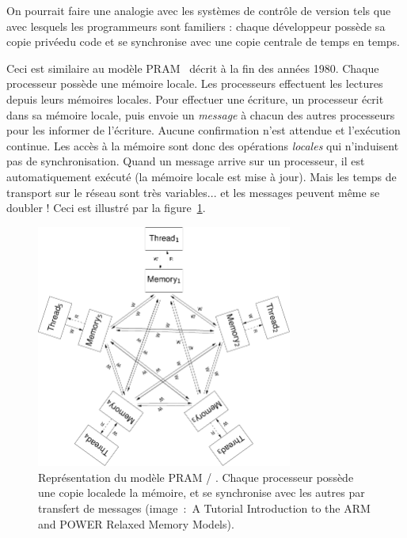 \medskip

On pourrait faire une analogie avec les systèmes de contrôle de
version tels que  avec lesquels les programmeurs sont
familiers : chaque développeur possède sa \og copie privée\fg du code
et se synchronise avec une copie centrale de temps en temps.

Ceci est similaire au modèle PRAM~\cite{Lipton1988PramAS} décrit à la fin des
années 1980. Chaque processeur possède une mémoire locale. Les processeurs
effectuent les lectures depuis leurs mémoires locales. Pour effectuer une
écriture, un processeur écrit dans sa mémoire locale, puis envoie un
\emph{message} à chacun des autres processeurs pour les informer de
l'écriture. Aucune confirmation n'est attendue et l'exécution continue. Les
accès à la mémoire sont donc des opérations \emph{locales} qui n'induisent pas
de synchronisation. Quand un message arrive sur un processeur, il est
automatiquement exécuté (la mémoire locale est mise à jour). Mais les temps de
transport sur le réseau sont très variables... et les messages peuvent même se
doubler ! Ceci est illustré par la figure~\ref{fig:pram}.

\begin{figure}
  \centering
  \includegraphics[width=0.75\textwidth]{pram_archi}
  \caption{Représentation du modèle PRAM / \OMP. Chaque processeur possède
    une \og copie locale\fg de la mémoire, et se synchronise avec les
    autres par transfert de messages (image~:~A Tutorial Introduction
    to the ARM and POWER Relaxed Memory Models). \label{fig:pram}}
\end{figure}



